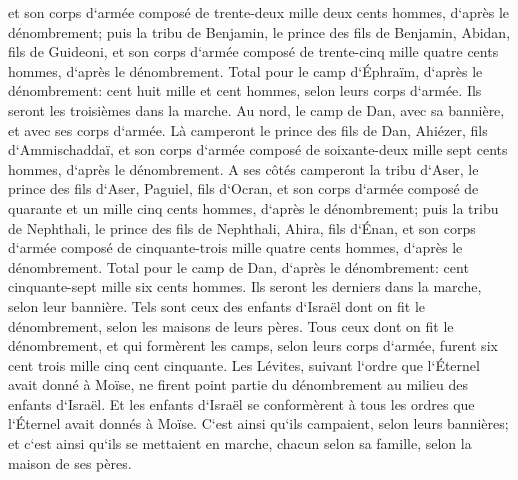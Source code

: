 \verse et son corps d`armée composé de trente-deux mille deux cents hommes, d`après le dénombrement; 
\verse puis la tribu de Benjamin, le prince des fils de Benjamin, Abidan, fils de Guideoni, 
\verse et son corps d`armée composé de trente-cinq mille quatre cents hommes, d`après le dénombrement. 
\verse Total pour le camp d`Éphraïm, d`après le dénombrement: cent huit mille et cent hommes, selon leurs corps d`armée. Ils seront les troisièmes dans la marche. 
\verse Au nord, le camp de Dan, avec sa bannière, et avec ses corps d`armée. Là camperont le prince des fils de Dan, Ahiézer, fils d`Ammischaddaï, 
\verse et son corps d`armée composé de soixante-deux mille sept cents hommes, d`après le dénombrement. 
\verse A ses côtés camperont la tribu d`Aser, le prince des fils d`Aser, Paguiel, fils d`Ocran, 
\verse et son corps d`armée composé de quarante et un mille cinq cents hommes, d`après le dénombrement; 
\verse puis la tribu de Nephthali, le prince des fils de Nephthali, Ahira, fils d`Énan, 
\verse et son corps d`armée composé de cinquante-trois mille quatre cents hommes, d`après le dénombrement. 
\verse Total pour le camp de Dan, d`après le dénombrement: cent cinquante-sept mille six cents hommes. Ils seront les derniers dans la marche, selon leur bannière. 
\verse Tels sont ceux des enfants d`Israël dont on fit le dénombrement, selon les maisons de leurs pères. Tous ceux dont on fit le dénombrement, et qui formèrent les camps, selon leurs corps d`armée, furent six cent trois mille cinq cent cinquante. 
\verse Les Lévites, suivant l`ordre que l`Éternel avait donné à Moïse, ne firent point partie du dénombrement au milieu des enfants d`Israël. 
\verse Et les enfants d`Israël se conformèrent à tous les ordres que l`Éternel avait donnés à Moïse. C`est ainsi qu`ils campaient, selon leurs bannières; et c`est ainsi qu`ils se mettaient en marche, chacun selon sa famille, selon la maison de ses pères. 

